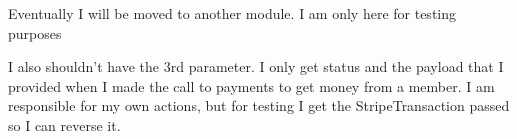 \documentclass[letterpaper,10pt,english]{sphinxmanual}
\begin{document}

\begin{fulllineitems}
\label{\detokenize{payments:payments.core.test_callback}}
Eventually I will be moved to another module. I am only here for testing purposes

I also shouldn’t have the 3rd parameter. I only get status and the payload that I provided
when I made the call to payments to get money from a member. I am responsible for my own
actions, but for testing I get the StripeTransaction passed so I can reverse it.

\end{fulllineitems}

\end{document}
